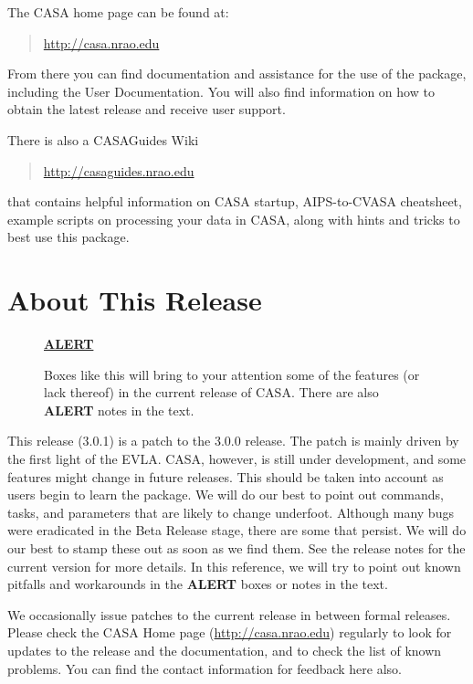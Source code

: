 The CASA home page can be found at:
\begin{quote}
  \url{http://casa.nrao.edu}
\end{quote}
From there you can find documentation and assistance for the use
of the package, including the User Documentation.  You will
also find information on how to obtain the latest release and
receive user support.

There is also a CASAGuides Wiki
\begin{quote}
   \url{http://casaguides.nrao.edu}
\end{quote}
that contains helpful information on CASA startup, AIPS-to-CVASA
cheatsheet, example scripts on processing your data in CASA,
along with hints and tricks to best use this package.


\section{About This Release}
\label{section:intro.release}

\begin{wrapfigure}{r}{2.5in}
  \begin{boxedminipage}{2.5in}
     \centerline{\underline{\bf ALERT}}
     Boxes like this will bring to your attention some of the
     features (or lack thereof) in the current release
     of CASA.  There are also {\bf ALERT} notes in the text.
  \end{boxedminipage}
\end{wrapfigure}

This release (3.0.1) is a patch to the 3.0.0 release.  The patch is
mainly driven by the first light of the EVLA. CASA, however, is still
under development, and some features might change in future releases.
This should be taken into account as users begin to learn the package.
We will do our best to point out commands, tasks, and parameters that
are likely to change underfoot.  Although many bugs were eradicated in
the Beta Release stage, there are some that persist.  We will do our
best to stamp these out as soon as we find them.  See the release
notes for the current version for more details.  In this reference, we
will try to point out known pitfalls and workarounds in the {\bf
  ALERT} boxes or notes in the text.

We occasionally issue patches to the current release in between formal
releases.  Please check the CASA Home page (\url{http://casa.nrao.edu}) regularly
to look for updates to the release and the documentation,
and to check the list of known problems.  You can find the contact
information for feedback here also.

